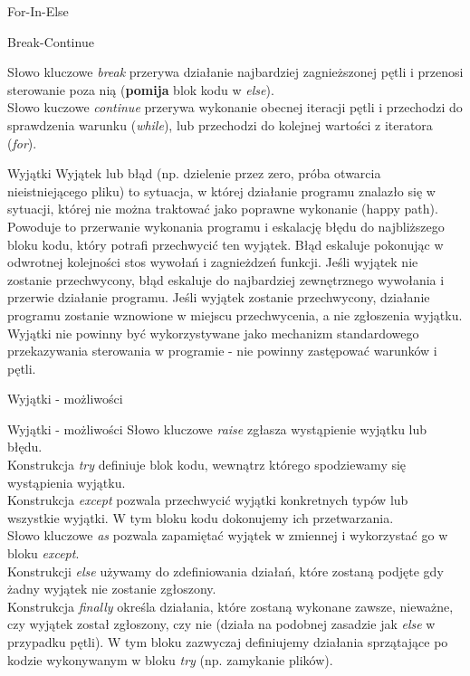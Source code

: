 \begin{frame}{For-In-Else}
    
\end{frame}

\begin{frame}{Break-Continue}
    
    Słowo kluczowe \emph{break} przerywa działanie najbardziej zagnieższonej pętli i przenosi sterowanie poza nią (\textbf{pomija} blok kodu w \emph{else}). \\
    Słowo kuczowe \emph{continue} przerywa wykonanie obecnej iteracji pętli i przechodzi do sprawdzenia warunku (\emph{while}), lub przechodzi do kolejnej wartości z iteratora (\emph{for}).
\end{frame}

\begin{frame}{Wyjątki}
    Wyjątek lub błąd (np. dzielenie przez zero, próba otwarcia nieistniejącego pliku) to sytuacja, w której działanie programu znalazło się w sytuacji, której nie można traktować jako poprawne wykonanie (happy path). \\
    Powoduje to przerwanie wykonania programu i eskalację błędu do najbliższego bloku kodu, który potrafi przechwycić ten wyjątek. Błąd eskaluje pokonując w odwrotnej kolejności stos wywołań i zagnieżdzeń funkcji. Jeśli wyjątek nie zostanie przechwycony, błąd eskaluje do najbardziej zewnętrznego wywołania i przerwie działanie programu. Jeśli wyjątek zostanie przechwycony, działanie programu zostanie wznowione w miejscu przechwycenia, a nie zgłoszenia wyjątku. \\
    Wyjątki nie powinny być wykorzystywane jako mechanizm standardowego przekazywania sterowania w programie - nie powinny zastępować warunków i pętli.
\end{frame}

\begin{frame}{Wyjątki - możliwości}
    
\end{frame}

\begin{frame}{Wyjątki - możliwości}
   Słowo kluczowe \emph{raise} zgłasza wystąpienie wyjątku lub błędu. \\
   Konstrukcja \emph{try} definiuje blok kodu, wewnątrz którego spodziewamy się wystąpienia wyjątku. \\
   Konstrukcja \emph{except} pozwala przechwycić wyjątki konkretnych typów lub wszystkie wyjątki. W tym bloku kodu dokonujemy ich przetwarzania. \\
   Słowo kluczowe \emph{as} pozwala zapamiętać wyjątek w zmiennej i wykorzystać go w bloku \emph{except}. \\
   Konstrukcji \emph{else} używamy do zdefiniowania działań, które zostaną podjęte gdy żadny wyjątek nie zostanie zgłoszony. \\
   Konstrukcja \emph{finally} określa działania, które zostaną wykonane zawsze, nieważne, czy wyjątek został zgłoszony, czy nie (działa na podobnej zasadzie jak \emph{else} w przypadku pętli). W tym bloku zazwyczaj definiujemy działania sprzątające po kodzie wykonywanym w bloku \emph{try} (np. zamykanie plików).
\end{frame}

